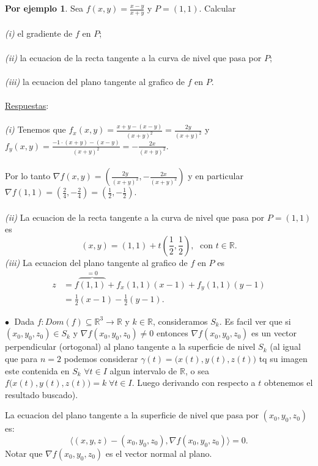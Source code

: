 \documentclass{article}
\theoremstyle{definition}
\newtheorem*{ej}{Por ejemplo}
\theoremstyle{remark}
\newcommand\bl{$\bullet\;$}
\begin{document}
\begin{ej}
  Sea $f(x,y)=\frac{x-y}{x+y}$ y $P=(1,1)$. Calcular \\\\
  \emph{(i)\phantom{ii}} el gradiente de $f$ en $P$;\\\\
  \emph{(ii)\phantom{i}} la ecuacion de la recta tangente a la curva de nivel que pasa por $P$; \\\\
  \emph{(iii)} la ecuacion del plano tangente al grafico de $f$ en $P$.\\\\
  \underline{Respuestas}:\\\\ \emph{(i)\phantom{ii}} Tenemos que \mbox{$f_x(x,y)=\frac{x+y-(x-y)}{(x+y)^2}=\frac{2y}{(x+y)^2}$} y \mbox{$f_y(x,y)=\frac{-1\cdot(x+y)-(x-y)}{(x+y)^2}=-\frac{2x}{(x+y)^2}.$} \\\\ Por lo tanto $\nabla f(x,y)=\left(\frac{2y}{(x+y)^2},-\frac{2x}{(x+y)^2}\right)$ y en particular \mbox{$\nabla f(1,1)=\left(\frac{2}{4},-\frac{2}{4}\right)=\left(\frac{1}{2},-\frac{1}{2}\right).$} \\\\
  \emph{(ii)\phantom{i}} La ecuacion de la recta tangente a la curva de nivel que pasa por $P=(1,1)$ es \[
    (x,y)=(1,1)+t\left(\frac{1}{2},\frac{1}{2}\right), \; \text{ con } t \in \mathbb{R}.
    \]\emph{(iii)} La ecuacion del plano tangente al grafico de $f$ en $P$ es \[\begin{aligned}
    z & =f\overbrace{(1,1)}^{=0}+f_x(1,1)(x-1)+f_y(1,1)(y-1) \\
     & = \frac{1}{2}(x-1)-\frac{1}{2}(y-1).
  \end{aligned}\]
\end{ej} 
\textcolor{rojop2}{\bl} Dada $f : Dom(f) \subseteq \mathbb{R}^3 \to \mathbb{R}$ y $k \in \mathbb{R}$, consideramos $S_k$. Es facil ver que si $(x_0,y_0,z_0) \in S_k$ y $\nabla f(x_0,y_0,z_0) \neq 0$ entonces $\nabla f(x_0,y_0,z_0)$ es un vector perpendicular (ortogonal) al plano tangente a la superficie de nivel $S_k$ (al igual que para $n=2$ podemos considerar $\gamma(t)=\big(x(t),y(t),z(t)\big)$ tq su imagen este contenida en $S_k$ \; $\forall t \in I$ algun intervalo de $\mathbb{R}$, o sea $f\big(x(t),y(t),z(t)\big)=k \; \forall t \in I$. Luego derivando con respecto a $t$ obtenemos el resultado buscado). \pagebreak 
\begin{defi}
  La ecuacion del plano tangente a la superficie de nivel que pasa por $(x_0,y_0,z_0)$ es: \[
\big\langle (x,y,z)-(x_0,y_0,z_0), \nabla f(x_0,y_0,z_0) \big\rangle =0.
  \] Notar que $\nabla f(x_0,y_0,z_0)$ es el vector normal al plano.
\end{defi}
\end{document}
